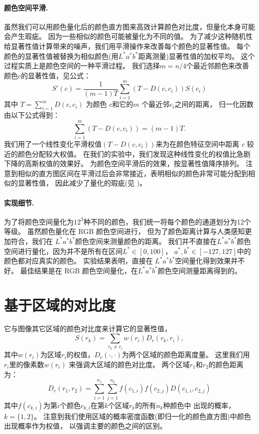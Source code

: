 \documentclass[final]{cvpr}
\newcommand{\Lab}{$L^*a^*b^*$}
\newcommand{\mypara}[1]{\paragraph{#1.}}
\begin{document}


\mypara{颜色空间平滑}
虽然我们可以用颜色量化后的颜色直方图来高效计算颜色对比度，但量化本身可能会产生瑕疵。
因为一些相似的颜色可能被量化为不同的值。
为了减少这种随机性给显著性值计算带来的噪声，我们用平滑操作来改善每个颜色的显著性值。
每个颜色的显著性值被替换为相似颜色(用\Lab 距离测量)显著性值的加权平均。
这个过程实质上是颜色空间的一种平滑过程。
我们选择$m=n/4$个最近邻颜色来改善颜色$c$的显著性值，见公式：
\begin{equation}\label{equ:smoothing}
    S'(c) = \frac{1}{(m-1)T} \sum_{i=1}^{m} (T-D(c, c_i))S(c_i)
\end{equation}
其中 $T=\sum_{i=1}^{m} D(c, c_i)$ 为颜色 $c$和它的$m$ 个最近邻$c_i$之间的距离，
归一化因数由以下公式得到：
\begin{equation*}\label{equ:smoothingN}
    \sum_{i=1}^{m} (T-D(c, c_i))=(m-1)T.
\end{equation*}
我们用了一个线性变化平滑权值$(T-D(c, c_i))$来为在颜色特征空间中距离
$c$ 较近的颜色分配较大权值。
在我们的实验中，我们发现这种线性变化的权值比急剧下降的高斯权值的效果好。
为颜色空间平滑后的效果，按显著性值降序排列。
注意到相似的直方图区间在平滑过后会非常接近，表明相似的颜色非常可能分配到相似的显著性值，
因此减少了量化的瑕疵(见 )。


\mypara{实现细节}
为了将颜色空间量化为$12^3$种不同的颜色，我们统一将每个颜色的通道划分为12个等级。
虽然颜色量化在 RGB 颜色空间进行，
但为了颜色距离计算与人类感知更加符合，我们在 \Lab 颜色空间来测量颜色的距离。
我们并不直接在\Lab 颜色空间进行量化，因为并不是所有在区间$L^*\in[0, 100]$，
$a^*, b^*\in[-127,127]$中的颜色都对应真实的颜色。
实验结果表明，直接在 \Lab 空间量化得到效果并不好。
最佳结果是在 RGB 颜色空间量化，在\Lab 颜色空间测量距离得到的。




\section{基于区域的对比度}




它与图像其它区域的颜色对比度来计算它的显著性值，
\begin{equation}\label{equ:regContrastSaliency}
    S(r_k) = \sum_{r_k \neq r_i} w(r_i)  D_r(r_k, r_i),
\end{equation}
其中$w(r_i)$为区域$r_i$的权值，$D_r(\cdot, \cdot)$为两个区域的颜色距离度量。
这里我们用 $r_i$里的像素数$w(r_i)$ 来强调大区域的颜色对比度。
两个区域$r_1$和$r_2$的颜色距离为：
\begin{equation}\label{equ:regContrast}
    D_r(r_1, r_2) = \sum_{i=1}^{n_1} \sum_{j=1}^{n_2} f(c_{1,i}) f(c_{2,j}) D(c_{1,i}, c_{2,j})
\end{equation}
其中$f(c_{k,i})$为第$i$个颜色$c_{k,i}$在第$k$个区域$r_k$的所有$n_k$种颜色中
出现的概率，$k=\{1,2\}$。
注意到我们使用区域的概率密度函数(即归一化的颜色直方图)中颜色出现概率作为权值，
以强调主要的颜色之间的区别。
\end{document}
